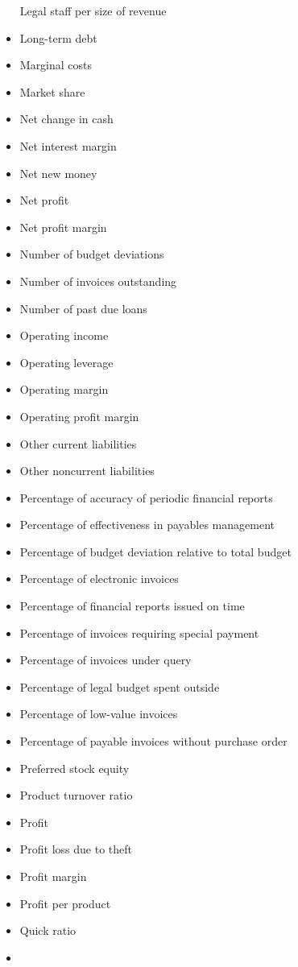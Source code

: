 \documentclass[]{book}
\begin{document}
\begin{itemize}
  Legal staff per size of revenue
\item
  Long-term debt
\item
  Marginal costs
\item
  Market share
\item
  Net change in cash
\item
  Net interest margin
\item
  Net new money
\item
  Net profit
\item
  Net profit margin
\item
  Number of budget deviations
\item
  Number of invoices outstanding
\item
  Number of past due loans
\item
  Operating income
\item
  Operating leverage
\item
  Operating margin
\item
  Operating profit margin
\item
  Other current liabilities
\item
  Other noncurrent liabilities
\item
  Percentage of accuracy of periodic financial reports
\item
  Percentage of effectiveness in payables management
\item
  Percentage of budget deviation relative to total budget
\item
  Percentage of electronic invoices
\item
  Percentage of financial reports issued on time
\item
  Percentage of invoices requiring special payment
\item
  Percentage of invoices under query
\item
  Percentage of legal budget spent outside
\item
  Percentage of low-value invoices
\item
  Percentage of payable invoices without purchase order
\item
  Preferred stock equity
\item
  Product turnover ratio
\item
  Profit
\item
  Profit loss due to theft
\item
  Profit margin
\item
  Profit per product
\item
  Quick ratio
\item

\end{itemize}
\end{document}
